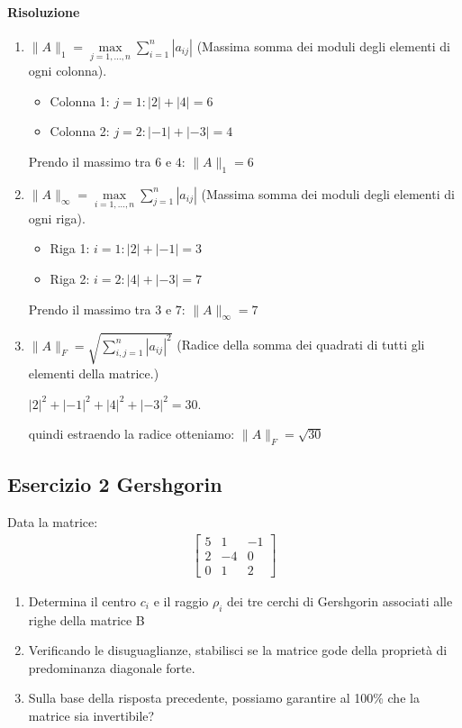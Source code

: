 \documentclass[a4paper,12pt]{article}
\begin{document}
		\paragraph{Risoluzione}
		\begin{enumerate}
			\item $\|A\|_1 = \max\limits_{j=1,...,n} \sum_{i=1}^{n} |a_{ij}|$ (Massima somma dei moduli degli elementi di ogni colonna).
			
			\begin{itemize}
				\item Colonna 1: $j = 1: |2| + |4| = 6$
				\item Colonna 2: $j = 2: |-1| + |-3| = 4$
			\end{itemize}
			Prendo il massimo tra $6$ e $4$: $\|A\|_1 = 6$
			\item $\|A\|_{\infty} = \max\limits_{i=1,...,n} \sum_{j=1}^{n} |a_{ij}|$ (Massima somma dei moduli degli elementi di ogni riga).
			
			\begin{itemize}
				\item Riga 1: $i = 1: |2| + |-1| = 3$
				\item Riga 2: $i = 2: |4| + |-3| = 7$
			\end{itemize}
			Prendo il massimo tra $3$ e $7$: $\|A\|_{\infty} = 7$
			
			\item $\|A\|_F = \sqrt{\sum_{i,j = 1}^{n} |a_{ij}|^2}$ (Radice della somma dei quadrati di tutti gli elementi della matrice.)
			
			$|2|^2 + |-1|^2 + |4|^2 + |-3|^2 = 30$.
			
			 quindi estraendo la radice otteniamo: $\|A\|_F = \sqrt{30}$
		\end{enumerate}
		\subsection{Esercizio 2 {Gershgorin}}
		Data la matrice:
		\begin{align*}
			\begin{bmatrix}
				5 & 1 & -1 \\
				2 & -4 & 0 \\
				0 & 1 & 2 
			\end{bmatrix}
		\end{align*}
		\begin{enumerate}
			\item Determina il centro $c_{i}$ e il raggio $\rho_i$ dei tre cerchi di Gershgorin associati alle righe della matrice B
			\item Verificando le disuguaglianze, stabilisci se la matrice gode della proprietà di predominanza diagonale forte.
			\item Sulla base della risposta precedente, possiamo garantire al 100\% che la matrice sia invertibile?
		\end{enumerate}
\end{document}
